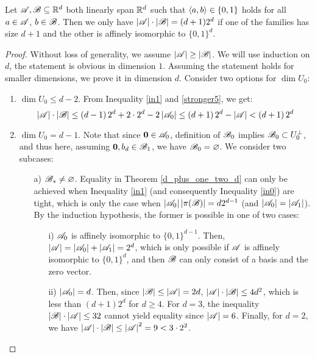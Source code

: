 \begin{theorem}\label{uniq}
    Let ${\mathscr{A}},{\mathscr{B}} \subseteq {\mathbb{R}}^d$ both linearly span ${\mathbb{R}}^d$ such that $\langle a, b\rangle \in \{0,1\}$ holds for all $a \in {\mathscr{A}}$, $b \in {\mathscr{B}}$. Then we only have $|{\mathscr{A}}| \cdot |{\mathscr{B}}| = (d+1) 2^d$ if one of the families has size $d+1$ and the other is affinely isomorphic to $\{0,1\}^d$.
\end{theorem}
\begin{proof}
     Without loss of generality, we assume $\left|{\mathscr{A}}\right| \geq \left|{\mathscr{B}}\right|$. We will use induction on $d$, the statement is obvious in dimension $1$. Assuming the statement holds for smaller dimensions, we prove it in dimension $d$. Consider two options for $\operatorname{dim}U_0$:
    \begin{enumerate}
        \item $\operatorname{dim}U_0 \leq d-2$. From Inequality \ref{in1} and \eqref{stronger5}, we get:
        \begin{equation*}
            \left|{\mathscr{A}}\right| \cdot\left|{\mathscr{B}}\right| \leq 
            \left(d - 1\right) 2^d + 2\cdot2^d - 2\left|{\mathscr{A}}_0\right| \leq
            \left(d + 1\right) 2^d - \left|{\mathscr{A}}\right| < \left(d + 1\right) 2^d
        \end{equation*}
        \item $\operatorname{dim}U_0 = d-1$. Note that since $\mathbf{0} \in {\mathscr{A}}_0$, definition of ${\mathscr{B}}_0$ implies ${\mathscr{B}}_0 \subset U_0^\bot$, and thus here, assuming $\mathbf{0}, b_d \in {\mathscr{B}}_1$, we have ${\mathscr{B}}_0 = \varnothing$. We consider two subcases:
        \begin{enumerate}
            \item[a)]\label{uniqfirstcase} ${\mathscr{B}}_*\neq\varnothing$. Equality in Theorem \ref{d_plus_one_two_d} can only be achieved when Inequality \ref{in1} (and consequently Inequality \ref{in0}) are tight, which is only the case when  $\left|{\mathscr{A}}_0\right|\left|\pi({\mathscr{B}})\right|=d 2^{d-1}$ (and $\left|{\mathscr{A}}_0\right|=\left|{\mathscr{A}}_1\right|$). By the induction hypothesis, the former is possible in one of two cases:
            \begin{enumerate}
                \item[i)] ${\mathscr{A}}_0$ is affinely isomorphic to $\{0,1\}^{d-1}$. Then, $\left|{\mathscr{A}}\right|=\left|{\mathscr{A}}_0\right|+\left|{\mathscr{A}}_1\right|=2^d$, which is only possible if ${\mathscr{A}}$ is affinely isomorphic to $\{0,1\}^d$, and then ${\mathscr{B}}$ can only consist of a basis and the zero vector.
                \item[ii)] $\left|{\mathscr{A}}_0\right|=d$. Then, since $\left|{\mathscr{B}}\right|\leq\left|{\mathscr{A}}\right|=2d$,  $\left|{\mathscr{A}}\right|\cdot\left|{\mathscr{B}}\right|\leq4d^2$, which is less than $(d+1)2^d$ for $d\geq4$. For $d=3$, the inequality $\left|{\mathscr{B}}\right|\cdot\left|{\mathscr{A}}\right|\leq32$ cannot yield equality since $\left|{\mathscr{A}}\right|=6$. Finally, for $d=2$, we have $\left|{\mathscr{A}}\right|\cdot\left|{\mathscr{B}}\right|\leq\left|{\mathscr{A}}\right|^2=9<3\cdot2^2$.

\end{enumerate}
\end{enumerate}
\end{enumerate}
\end{proof}
